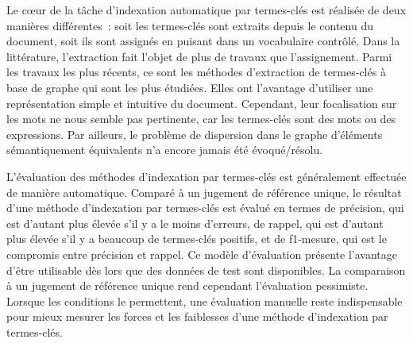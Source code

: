     Le c\oe{}ur de la tâche d'indexation automatique par termes-clés est
    réalisée de deux manières différentes~: soit les termes-clés sont extraits
    depuis le contenu du document, soit ils sont assignés en puisant dans un
    vocabulaire contrôlé. Dans la littérature, l'extraction fait l'objet de plus
    de travaux que l'assignement. Parmi les travaux les plus récents, ce sont
    les méthodes d'extraction de termes-clés à base de graphe qui sont les plus
    étudiées. Elles ont l'avantage d'utiliser une représentation simple et
    intuitive du document. Cependant, leur focalisation sur les mots ne nous
    semble pas pertinente, car les termes-clés sont des mots ou des expressions.
    Par ailleurs, le problème de dispersion dans le graphe d'éléments
    sémantiquement équivalents n'a encore jamais été évoqué/résolu.

    L'évaluation des méthodes d'indexation par termes-clés est généralement
    effectuée de manière automatique. Comparé à un jugement de référence unique,
    le résultat d'une méthode d'indexation par termes-clés est évalué en termes
    de précision, qui est d'autant plus élevée s'il y a le moins d'erreurs, de
    rappel, qui est d'autant plus élevée s'il y a beaucoup de termes-clés
    positifs, et de f1-mesure, qui est le compromis entre précision et rappel.
    Ce modèle d'évaluation présente l'avantage d'être utilisable dès lors que
    des données de test sont disponibles. La comparaison à un jugement de
    référence unique rend cependant l'évaluation pessimiste. Lorsque les
    conditions le permettent, une évaluation manuelle reste indispensable pour
    mieux mesurer les forces et les faiblesses d'une méthode d'indexation par
    termes-clés.

